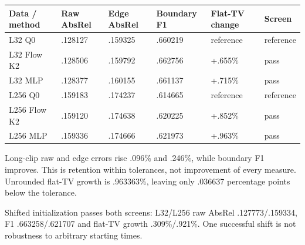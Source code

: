 \documentclass[
  10pt,
]{article}
\begin{document}
\begin{longtable}[]{@{}
  >{\raggedright\arraybackslash}p{}
  >{\raggedleft\arraybackslash}p{}
  >{\raggedleft\arraybackslash}p{}
  >{\raggedleft\arraybackslash}p{}
  >{\raggedleft\arraybackslash}p{}
  >{\raggedright\arraybackslash}p{}@{}}
\toprule\noalign{}
\begin{minipage}[b]{\linewidth}\raggedright
Data / method
\end{minipage} & \begin{minipage}[b]{\linewidth}\raggedleft
Raw AbsRel
\end{minipage} & \begin{minipage}[b]{\linewidth}\raggedleft
Edge AbsRel
\end{minipage} & \begin{minipage}[b]{\linewidth}\raggedleft
Boundary F1
\end{minipage} & \begin{minipage}[b]{\linewidth}\raggedleft
Flat-TV change
\end{minipage} & \begin{minipage}[b]{\linewidth}\raggedright
Screen
\end{minipage} \\
\midrule\noalign{}
\endhead
\bottomrule\noalign{}
\endlastfoot
L32 Q0 & .128127 & .159325 & .660219 & reference & reference \\
L32 Flow K2 & .128506 & .159792 & .662756 & +.655\% & pass \\
L32 MLP & .128377 & .160155 & .661137 & +.715\% & pass \\
L256 Q0 & .159183 & .174237 & .614665 & reference & reference \\
L256 Flow K2 & .159120 & .174638 & .620225 & +.852\% & pass \\
L256 MLP & .159336 & .174666 & .621973 & +.963\% & pass \\
\end{longtable}

Long-clip raw and edge errors rise .096\% and .246\%, while boundary F1
improves. This is retention within tolerances, not improvement of every
measure. Unrounded flat-TV growth is .963363\%, leaving only .036637
percentage points below the tolerance.

Shifted initialization passes both screens: L32/L256 raw AbsRel
.127773/.159334, F1 .663258/.621707 and flat-TV growth .309\%/.921\%.
One successful shift is not robustness to arbitrary starting times.
\end{document}
